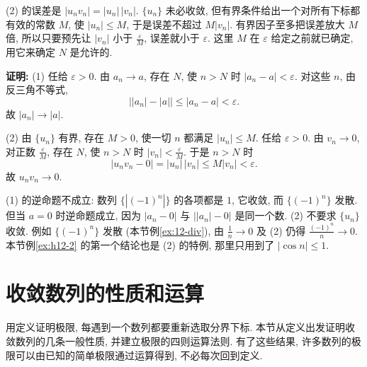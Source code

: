 \documentclass[UTF8,openany]{ctexbook}
\theoremstyle{chinesetextbook}
\newenvironment{cnproof}{\par\indent\textbf{证明:} \ignorespaces}{\par}
\begin{document}
(2) 的误差是 $|u_nv_n|=|u_n|\,|v_n|$. $\{u_n\}$ 未必收敛, 但有界条件给出一个对所有下标都有效的常数 $M$, 使 $|u_n|\le M$, 于是误差不超过 $M|v_n|$. 有界因子至多把误差放大 $M$ 倍, 所以只要预先让 $|v_n|$ 小于 $\displaystyle\frac\varepsilon M$, 误差就小于 $\varepsilon$. 这里 $M$ 在 $\varepsilon$ 给定之前就已确定, 用它来确定 $N$ 是允许的.
\begin{cnproof}
(1) 任给 $\varepsilon>0$. 由 $a_n\to a$, 存在 $N$, 使 $n>N$ 时 $|a_n-a|<\varepsilon$. 对这些 $n$, 由反三角不等式,
\[
\bigl||a_n|-|a|\bigr|\le|a_n-a|<\varepsilon.
\]
故 $|a_n|\to|a|$.

(2) 由 $\{u_n\}$ 有界, 存在 $M>0$, 使一切 $n$ 都满足 $|u_n|\le M$. 任给 $\varepsilon>0$. 由 $v_n\to0$, 对正数 $\displaystyle\frac\varepsilon M$, 存在 $N$, 使 $n>N$ 时 $\displaystyle|v_n|<\frac\varepsilon M$. 于是 $n>N$ 时
\[
|u_nv_n-0|=|u_n|\,|v_n|\le M|v_n|<\varepsilon.
\]
故 $u_nv_n\to0$.
\end{cnproof}
(1) 的逆命题不成立: 数列 $\{|(-1)^n|\}$ 的各项都是 $1$, 它收敛, 而 $\{(-1)^n\}$ 发散. 但当 $a=0$ 时逆命题成立, 因为 $|a_n-0|$ 与 $\bigl||a_n|-0\bigr|$ 是同一个数. (2) 不要求 $\{u_n\}$ 收敛. 例如 $\{(-1)^n\}$ 发散 (本节例\ref{ex:12-div}), 由 $\displaystyle\frac1n\to0$ 及 (2) 仍得 $\displaystyle\frac{(-1)^n}n\to0$. 本节例\ref{ex:h12-2} 的第一个结论也是 (2) 的特例, 那里只用到了 $|\cos n|\le1$.
\section{收敛数列的性质和运算}
用定义证明极限, 每遇到一个数列都要重新选取分界下标. 本节从定义出发证明收敛数列的几条一般性质, 并建立极限的四则运算法则. 有了这些结果, 许多数列的极限可以由已知的简单极限通过运算得到, 不必每次回到定义.
\end{document}
